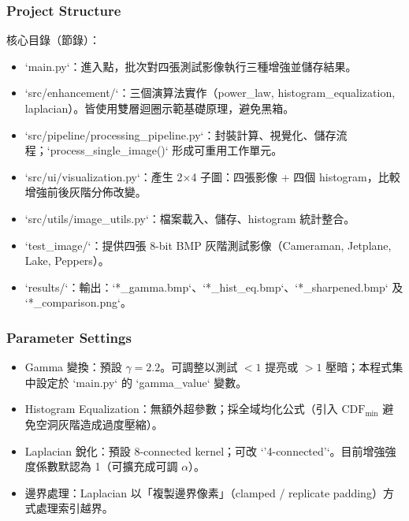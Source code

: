 \documentclass[12pt,a4paper]{article}
\begin{document}
\subsubsection{Project Structure}
核心目錄（節錄）：
\begin{itemize}
  \item `main.py`：進入點，批次對四張測試影像執行三種增強並儲存結果。
  \item `src/enhancement/`：三個演算法實作（power\_law, histogram\_equalization, laplacian）。皆使用雙層迴圈示範基礎原理，避免黑箱。
  \item `src/pipeline/processing_pipeline.py`：封裝計算、視覺化、儲存流程；`process_single_image()` 形成可重用工作單元。
  \item `src/ui/visualization.py`：產生 2×4 子圖：四張影像 + 四個 histogram，比較增強前後灰階分佈改變。
  \item `src/utils/image_utils.py`：檔案載入、儲存、histogram 統計整合。
  \item `test_image/`：提供四張 8-bit BMP 灰階測試影像（Cameraman, Jetplane, Lake, Peppers）。
  \item `results/`：輸出：`*_gamma.bmp`、`*_hist_eq.bmp`、`*_sharpened.bmp` 及 `*_comparison.png`。
\end{itemize}
\subsubsection{Parameter Settings}
\begin{itemize}
  \item Gamma 變換：預設 \(\gamma = 2.2\)。可調整以測試 \(<1\) 提亮或 \(>1\) 壓暗；本程式集中設定於 `main.py` 的 `gamma_value` 變數。
  \item Histogram Equalization：無額外超參數；採全域均化公式（引入 \(\mathrm{CDF}_{\min}\) 避免空洞灰階造成過度壓縮）。
  \item Laplacian 銳化：預設 8-connected kernel；可改 `'4-connected'`。目前增強強度係數默認為 1（可擴充成可調 \(\alpha\)）。
  \item 邊界處理：Laplacian 以「複製邊界像素」（clamped / replicate padding）方式處理索引越界。
\end{itemize}
\end{document}
